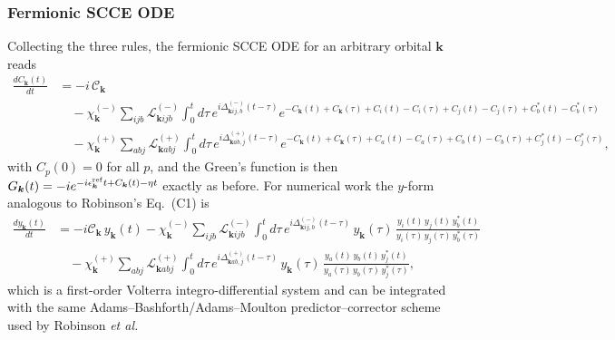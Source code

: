 \subsubsection{Fermionic SCCE ODE}
Collecting the three rules, the fermionic SCCE ODE for an arbitrary orbital $\bm{k}$ reads
\begin{align}
\frac{dC_{\bm{k}}(t)}{dt}
&=
-i\,\mathcal{C}_{\bm{k}}
\nonumber\\
&\quad
-\chi^{(-)}_{\bm{k}}
\sum_{ijb}
\mathcal{L}^{(-)}_{\bm{k}ijb}
\int_0^t d\tau\,
e^{i\Delta^{(-)}_{\bm{k}ij,b}(t-\tau)}
e^{
-C_{\bm{k}}(t)+C_{\bm{k}}(\tau)
+C_i(t)-C_i(\tau)
+C_j(t)-C_j(\tau)
+C_b^*(t)-C_b^*(\tau)
}
\nonumber\\
&\quad
-\chi^{(+)}_{\bm{k}}
\sum_{abj}
\mathcal{L}^{(+)}_{\bm{k}abj}
\int_0^t d\tau\,
e^{i\Delta^{(+)}_{\bm{k}ab,j}(t-\tau)}
e^{
-C_{\bm{k}}(t)+C_{\bm{k}}(\tau)
+C_a(t)-C_a(\tau)
+C_b(t)-C_b(\tau)
+C_j^*(t)-C_j^*(\tau)
},
\label{eq:fermSCCE}
\end{align}
with $C_p(0)=0$ for all $p$, and the Green's function is then $G_{\bm{k}}(t)=-ie^{-i\epsilon^{\rm ref}_{\bm{k}}t+C_{\bm{k}}(t)-\eta t}$ exactly as before. For numerical work the $y$-form analogous to Robinson's Eq.~(C1) is
\begin{align}
\frac{dy_{\bm{k}}(t)}{dt}
&=
-i\mathcal{C}_{\bm{k}}\,y_{\bm{k}}(t)
-\chi^{(-)}_{\bm{k}}\sum_{ijb}\mathcal{L}^{(-)}_{\bm{k}ijb}
\int_0^t d\tau\,e^{i\Delta^{(-)}_{\bm{k}ij,b}(t-\tau)}\,
y_{\bm{k}}(\tau)\,
\frac{y_i(t)\,y_j(t)\,y_b^*(t)}{y_i(\tau)\,y_j(\tau)\,y_b^*(\tau)}
\nonumber\\
&\quad
-\chi^{(+)}_{\bm{k}}\sum_{abj}\mathcal{L}^{(+)}_{\bm{k}abj}
\int_0^t d\tau\,e^{i\Delta^{(+)}_{\bm{k}ab,j}(t-\tau)}\,
y_{\bm{k}}(\tau)\,
\frac{y_a(t)\,y_b(t)\,y_j^*(t)}{y_a(\tau)\,y_b(\tau)\,y_j^*(\tau)},
\label{eq:yferm}
\end{align}
which is a first-order Volterra integro-differential system and can be integrated with the same Adams--Bashforth/Adams--Moulton predictor--corrector scheme used by Robinson \emph{et al.}

